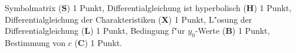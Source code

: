 \begin{bewertung}
Symbolmatrix ({\bf S}) 1 Punkt,
Differentialgleichung ist hyperbolisch ({\bf H}) 1 Punkt,
Differentialgleichung der Charakteristiken ({\bf X}) 1 Punkt,
L"osung der Differentialgleichung ({\bf L}) 1 Punkt,
Bedingung f"ur $y_0$-Werte ({\bf B}) 1 Punkt,
Bestimmung von $c$ ({\bf C}) 1 Punkt.
\end{bewertung}
